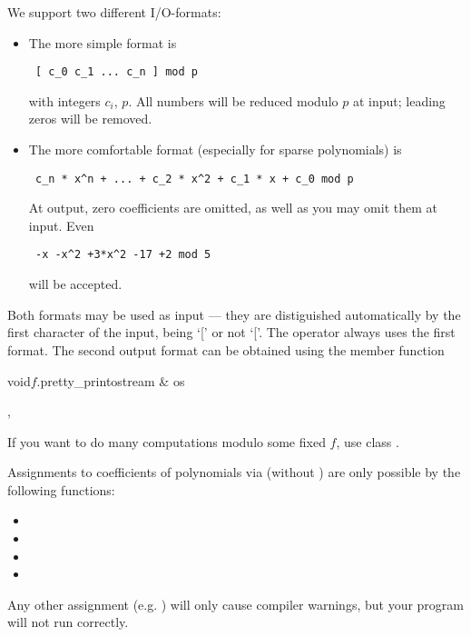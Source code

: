 We support two different I/O-formats:
\begin{itemize}
\item
  The more simple format is
\begin{verbatim} [ c_0 c_1 ... c_n ] mod p \end{verbatim}
with integers $c_i$, $p$.  All numbers will be reduced modulo $p$ at input; leading zeros will
be removed.

\item
  The more comfortable format (especially for sparse polynomials) is
\begin{verbatim} c_n * x^n + ... + c_2 * x^2 + c_1 * x + c_0 mod p
\end{verbatim}
At output, zero coefficients are omitted, as well as you may omit them at input.
Even \begin{verbatim} -x -x^2 +3*x^2 -17 +2 mod 5 \end{verbatim}
will be accepted.
\end{itemize}

Both formats may be used as input --- they are distiguished automatically by the first character
of the input, being `[' or not `['.  The  operator \code{<<} always uses the first
format.  The second output format can be obtained using the member function

\begin{cfcode}{void}{$f$.pretty_print}{ostream & os}
\end{cfcode}



\SEEALSO

, 



\NOTES

If you want to do many computations modulo some fixed  $f$, use class
.



\WARNINGS

Assignments to coefficients of polynomials via  (without
) are only possible by the following functions:
\begin{itemize}
\item {}
\item {}
\item {}
\item {}
\end{itemize}
Any other assignment (e.g. ) will only cause compiler warnings, but your
program will not run correctly.

